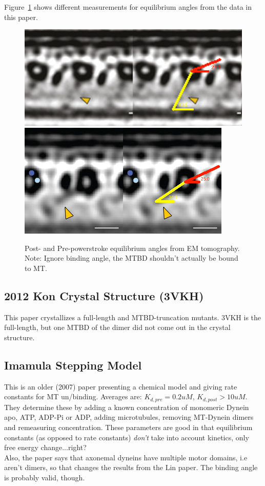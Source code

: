 \documentclass[10pt]{article} %
\begin{document}
Figure~\ref{fig:em_tomography_eq_angles} shows different measurements
for equilibrium angles from the data in this paper.
\begin{figure}[h!]
  \centering
  \includegraphics[width=.45\textwidth]{../figures/Post_powerstroke_tomography.jpg}
  \includegraphics[width=.45\textwidth]{../figures/Pre_powerstroke_tomography.jpg}
  \caption{Post- and Pre-powerstroke equilibrium angles from EM tomography. Note: Ignore binding angle, the MTBD shouldn't actually be bound to MT.}
  \label{fig:em_tomography_eq_angles}
\end{figure}

\subsection{2012 Kon Crystal Structure (3VKH)}
This paper crystallizes a full-length and MTBD-truncation mutants. 3VKH is the full-length, but one MTBD of the dimer did not come out in the crystal structure.

\subsection{Imamula Stepping Model}
This is an older (2007) paper presenting a chemical model and giving rate constants for MT un/binding. Averages are: $K_{d,pre} = 0.2uM$, $K_{d,post} > 10uM$. They determine these by adding a known concentration of monomeric Dynein apo, ATP, ADP-Pi or ADP, adding microtubules, removing MT-Dynein dimers and remeasuring concentration. These parameters are good in that equilibrium constants (as opposed to rate constants) \textit{don't} take into account kinetics, only free energy change...right?\\

Also, the paper says that axonemal dyneins have multiple motor domains, i.e aren't dimers, so that changes the results from the Lin paper. The binding angle is probably valid, though.\\
\end{document}
